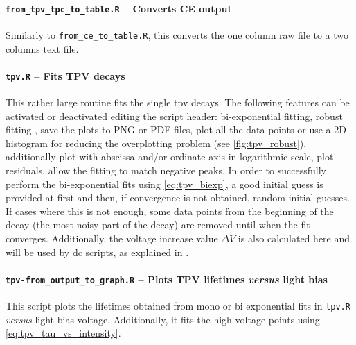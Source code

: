 		\paragraph{\texttt{from\_tpv\_tpc\_to\_table.R} -- Converts CE output}
		Similarly to \texttt{from\_ce\_to\_table.R}, this converts the one column raw file to a two columns text file.

		\paragraph{\texttt{tpv.R} -- Fits TPV decays}
		This rather large routine fits the single \gls{tpv} decays.
		The following features can be activated or deactivated editing the script header:
		bi-exponential fitting, robust fitting \cite{Maechler2018}, save the plots to PNG or PDF files, plot all the data points or use a 2D histogram for reducing the overplotting problem (see \cref{fig:tpv_robust}), additionally plot with abscissa and/or ordinate axis in logarithmic scale, plot residuals, allow the fitting to match negative peaks.
		In order to successfully perform the bi-exponential fits using \cref{eq:tpv_biexp}, a good initial guess is provided at first and then, if convergence is not obtained, random initial guesses.
		If cases where this is not enough, some data points from the beginning of the decay (the most noisy part of the decay) are removed until when the fit converges.
		Additionally, the voltage increase value $\Delta V$ is also calculated here and will be used by \gls{dc} scripts, as explained in .
		
%		
%				
		\paragraph{\texttt{tpv-\-from\_output\_to\_graph.R} -- Plots TPV lifetimes \textsl{versus} light bias}
		This script plots the lifetimes obtained from mono or bi exponential fits in \texttt{tpv.R} \textsl{versus} light bias voltage.
		Additionally, it fits the high voltage points using \cref{eq:tpv_tau_vs_intensity}.
%		
%

